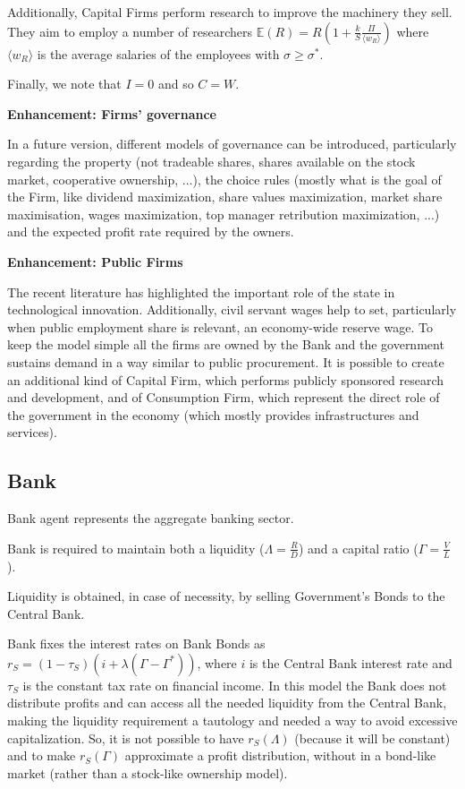 \documentclass[a4paper, headings=standardclasses]{scrartcl}
\newenvironment{enh}[1][]{\begin{framed}\noindent\textbf{Enhancement: #1}\par}{\end{framed}}
\begin{document}
Additionally, Capital Firms perform research to improve the machinery they sell. They aim to employ a number of researchers $\mathbb{E}(R) = R(1+\frac{k}{S}\frac{\Pi}{\langle w_R \rangle})$ where $\langle w_R \rangle$ is the average salaries of the employees with $\sigma \ge \sigma^*$.

Finally, we note that $I = 0$ and so $C=W$.

\begin{enh}[Firms' governance]
	In a future version, different models of governance can be introduced, particularly regarding the property (not tradeable shares, shares available on the stock market, cooperative ownership, ...), the choice rules (mostly what is the goal of the Firm, like dividend maximization, share values maximization, market share maximisation, wages maximization, top manager retribution maximization, ...) and the expected profit rate required by the owners.
\end{enh}

\begin{enh}[Public Firms]
	The recent literature has highlighted the important role of the state in technological innovation. Additionally, civil servant wages help to set, particularly when public employment share is relevant, an economy-wide reserve wage.
	To keep the model simple all the firms are owned by the Bank and the government sustains demand in a way similar to public procurement.
	It is possible to create an additional kind of Capital Firm, which performs publicly sponsored research and development, and of Consumption Firm, which represent the direct role of the government in the economy (which mostly provides infrastructures and services).
\end{enh}


\subsection{Bank}
Bank agent represents the aggregate banking sector.

Bank is required to maintain both a liquidity ($\Lambda = \frac{R}{D}$) and a capital ratio ($\Gamma = \frac{V}{L}$).

Liquidity is obtained, in case of necessity, by selling Government's Bonds to the Central Bank.

Bank fixes the interest rates on Bank Bonds as $r_S = (1 - \tau_S) (i + \lambda(\Gamma - \Gamma^*))$, where $i$ is the Central Bank interest rate and $\tau_S$ is the constant tax rate on financial income. In this model the Bank does not distribute profits and can access all the needed liquidity from the Central Bank, making the liquidity requirement a tautology and needed a way to avoid excessive capitalization. So, it is not possible to have $r_S(\Lambda)$ (because it will be constant) and to make $r_S(\Gamma)$ approximate a profit distribution, without in a bond-like market (rather than a stock-like ownership model).
\end{document}
